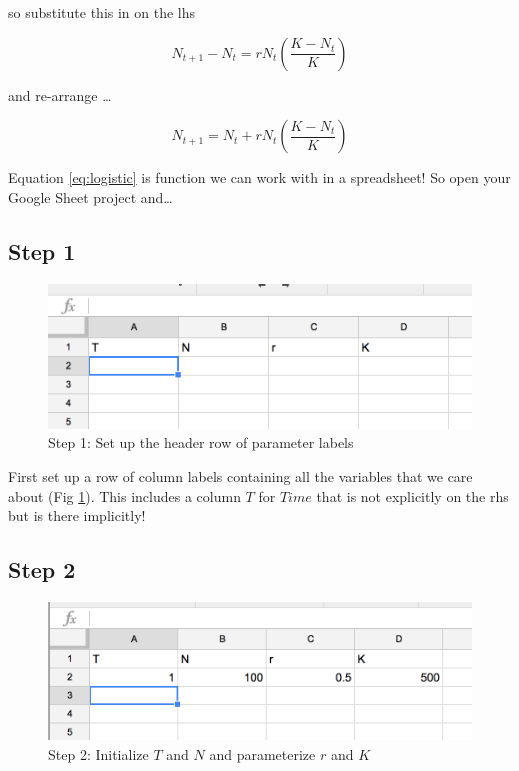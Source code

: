 \documentclass[]{book}
\begin{document}
so substitute this in on the lhs

\begin{equation}
N_{t+1} - N_t  = rN_t(\frac{K-N_t}{K})
\end{equation}

and re-arrange \ldots{}

\begin{equation}
N_{t+1} = N_t  + rN_t(\frac{K-N_t}{K})
\label{eq:logistic}
\end{equation}

Equation \eqref{eq:logistic} is function we can work with in a
spreadsheet! So open your Google Sheet project and\ldots{}

\subsection{Step 1}\label{step-1}

\begin{figure}

{\centering \includegraphics[width=0.8\linewidth]{images/logistic1} 

}

\caption{Step 1: Set up the header row of parameter labels}\label{fig:cancer-fig1}
\end{figure}

First set up a row of column labels containing all the variables that we
care about (Fig \ref{fig:cancer-fig1}). This includes a column \(T\) for
\(Time\) that is not explicitly on the rhs but is there implicitly!

\subsection{Step 2}\label{step-2}

\begin{figure}

{\centering \includegraphics[width=0.8\linewidth]{images/logistic2} 

}

\caption{Step 2: Initialize $T$ and $N$ and parameterize $r$ and $K$}\label{fig:cancer-fig2}
\end{figure}
\end{document}
